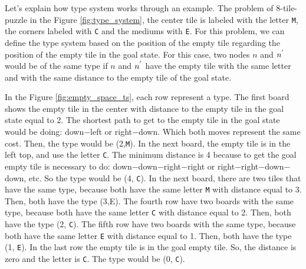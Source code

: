 Let's explain how type system works through an example. The problem of 8-tile-puzzle in the Figure \ref{fig:type_system}, the center tile is labeled with the letter \texttt{M}, the corners labeled with \texttt{C} and the mediums with \texttt{E}. For this problem, we can define the type system based on the position of the empty tile regarding the position of the empty tile in the goal state. For this case, two nodes $n$ and $n\sp{'}$ would be of the same type if $n$ and $n\sp{'}$ have the empty tile with the same letter and with the same distance to the empty tile of the goal state.

In the Figure \ref{fig:empty_space_ts}, each row represent a type. The first board shows the empty tile in the center with distance to the empty tile in the goal state equal to 2. The shortest path to get to the empty tile in the goal state would be doing: down$-$left or right$-$down. Which both moves represent the same cost. Then, the type would be (2,\texttt{M}). In the next board, the empty tile is in the left top, and use the letter \texttt{C}. The minimum distance is 4 because to get the goal empty tile is necessary to do: down$-$down$-$right$-$right or right$-$right$-$down$-$down, etc. So the type would be (4, \texttt{C}). In the next board, there are two tiles that have the same type, because both have the same letter \texttt{M} with distance equal to 3. Then, both have the type (3,E). The fourth row have two boards with the same type, because both have the same letter \texttt{C} with distance equal to 2. Then, both have the type (2, \texttt{C}). The fifth row have two boards with the same type, because both have the same letter \texttt{E} with distance equal to 1. Then, both have the type (1, \texttt{E}). In the last row the empty tile is in the goal empty tile. So, the distance is zero and the letter is \texttt{C}. The type would be (0, \texttt{C}).

